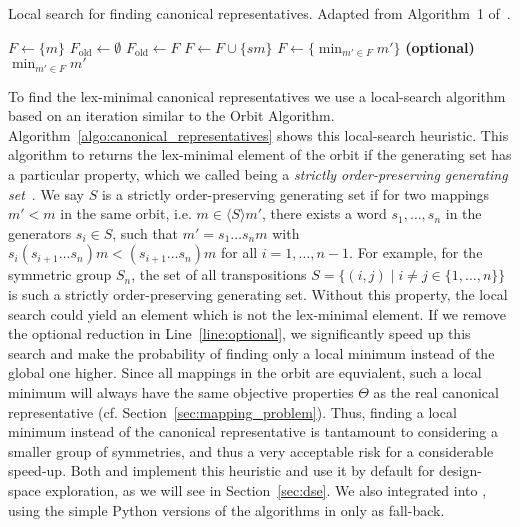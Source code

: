 \begin{algorithm}
   \caption{Local search for finding canonical representatives. Adapted from Algorithm~1 of~\cite{goens_mcsoc18}.}
   \label{algo:canonical_representatives}
   \begin{algorithmic}[1]
     \State $F \gets \{m\}$
     \State $F_\text{old} \gets \emptyset$
     \State $F_\text{old} \gets F$
     \State $F \gets F \cup \{sm\}$
     \EndIf
     \EndFor
     \EndFor
     \State \label{line:optional} $F \gets \{ \operatorname{min}_{ m' \in F} m' \}$ \textbf{(optional)}
     \EndWhile
     \Return $\operatorname{min}_{ m' \in F} m'$
   \end{algorithmic}
 \end{algorithm}
 
To find the lex-minimal canonical representatives we use a local-search algorithm based on an iteration similar to the Orbit Algorithm. 
Algorithm~\ref{algo:canonical_representatives} shows this local-search heuristic. 
This algorithm to returns the lex-minimal element of the orbit if the generating set has a particular property, which we called being a \emph{strictly order-preserving generating set}~\cite{goens_mcsoc18}.
We say $S$ is a strictly order-preserving generating set if for two mappings $m' < m$ in the same orbit, i.e. $m \in \langle S \rangle m'$, there exists a word $s_1,\ldots,s_n$ in the generators $s_i \in S$, such that $m' = s_1 \ldots s_n m$ with $s_i (s_{i+1}\ldots s_n)m < (s_{i+1} \ldots s_n)m$ for all $i = 1,\ldots,n-1$.
For example, for the symmetric group $S_n$, the set of all transpositions $S = \{ (i,j) \mid i \neq j \in \{1,\ldots,n\} \}$ is such a strictly order-preserving generating set.
Without this property, the local search could yield an element which is not the lex-minimal element.
If we remove the optional reduction in Line~\ref{line:optional}, we significantly speed up this search and make the probability of finding only a local minimum instead of the global one higher.
Since all mappings in the orbit are equvialent, such a local minimum will always have the same objective properties $\Theta$ as the real canonical representative (cf. Section~\ref{sec:mapping_problem}).
Thus, finding a local minimum instead of the canonical representative is tantamount to considering a smaller group of symmetries, and thus a very acceptable risk for a considerable speed-up.
Both \mpsym and \mocasin implement this heuristic and use it by default for design-space exploration, as we will see in Section~\ref{sec:dse}. 
We also integrated \mpsym into \mocasin , using the simple Python versions of the algorithms in \mocasin only as fall-back. 

